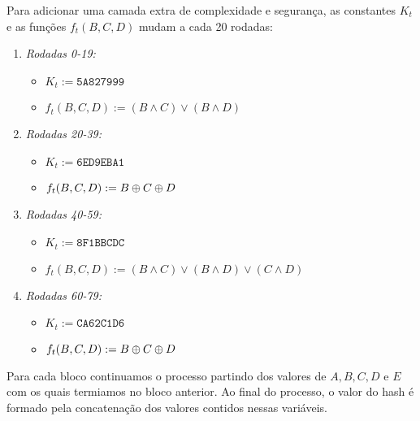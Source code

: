 \begin{center}
\end{center}

Para adicionar uma camada extra de complexidade e segurança, as constantes $K_t$ e as funções $f_t(B,C,D)$ mudam a cada 20 rodadas:

\begin{enumerate}
\item {\em Rodadas 0-19:}
  \begin{itemize}
  \item[] $K_t := \texttt{5A827999}$
  \item[] $f_t(B,C,D) := (B \land C) \lor (B \land D)$
  \end{itemize}
\item {\em Rodadas 20-39:}
  \begin{itemize}
  \item[] $K_t := \texttt{6ED9EBA1}$
  \item[] $f_t(B,C,D) := B \oplus C \oplus D$
  \end{itemize}
\item {\em Rodadas 40-59:}
  \begin{itemize}
  \item[] $K_t := \texttt{8F1BBCDC}$
  \item[] $f_t(B,C,D) := (B \land C) \lor (B \land D) \lor (C \land D)$
  \end{itemize}
\item {\em Rodadas 60-79:}
  \begin{itemize}
  \item[] $K_t := \texttt{CA62C1D6}$
  \item[] $f_t(B,C,D) := B \oplus C \oplus D$
  \end{itemize}
\end{enumerate}

Para cada bloco continuamos o processo partindo dos valores de $A, B, C, D$ e $E$ com os quais termiamos no bloco anterior.
Ao final do processo, o valor do hash é formado pela concatenação dos valores contidos nessas variáveis.

